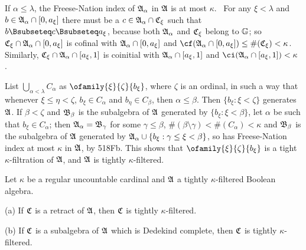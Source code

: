 {\medskip

 If $\alpha\le\lambda$, the Freese-Nation index of
$\frak A_{\alpha}$ in $\frak A$ is at most $\kappa$.   \Prf\ For any
$\xi<\lambda$ and $b\in\frak A_{\alpha}\cap[0,a_{\xi}]$ there must be a
$c\in\frak A_{\alpha}\cap\frak C_{\xi}$ such that
$b\Bsubseteq c\Bsubseteq a_{\xi}$, because both $\frak A_{\alpha}$ and
$\frak C_{\xi}$ belong to $\Bbb G$;  so
$\frak C_{\xi}\cap\frak A_{\alpha}\cap[0,a_{\xi}]$ is cofinal with
$\frak A_{\alpha}\cap[0,a_{\xi}]$ and
$\cf(\frak A_{\alpha}\cap[0,a_{\xi}])\le\#(\frak C_{\xi})<\kappa$.
Similarly, $\frak C_{\xi}\cap\frak A_{\alpha}\cap[a_{\xi},1]$ is
coinitial with $\frak A_{\alpha}\cap[a_{\xi},1]$ and
$\ci(\frak A_{\alpha}\cap[a_{\xi},1])<\kappa$.\ \Qed

\medskip

 List $\bigcup_{\alpha<\lambda}C_{\alpha}$ as
$\ofamily{\xi}{\zeta}{b_{\xi}}$, where $\zeta$ is an ordinal, in such a
way that whenever $\xi\le\eta<\zeta$, $b_{\xi}\in C_{\alpha}$ and
$b_{\eta}\in C_{\beta}$, then $\alpha\le\beta$.   Then
$\{b_{\xi}:\xi<\zeta\}$ generates $\frak A$.   If $\beta<\zeta$ and
$\frak B_{\beta}$ is the subalgebra of $\frak A$ generated by
$\{b_{\xi}:\xi<\beta\}$, let $\alpha$ be such that
$b_{\xi}\in C_{\alpha}$;  then $\frak A_{\alpha}=\frak B_{\gamma}$ for
some $\gamma\le\beta$, $\#(\beta\setminus\gamma)<\#(C_{\alpha})<\kappa$
and $\frak B_{\beta}$ is the subalgebra of $\frak A$ generated by
$\frak A_{\alpha}\cup\{b_{\xi}:\gamma\le\xi<\beta\}$, so has
Freese-Nation index at most $\kappa$ in $\frak A$, by 518Fb.   This
shows that $\ofamily{\xi}{\zeta}{b_{\xi}}$ is a tight
$\kappa$-filtration of $\frak A$, and $\frak A$ is tightly
$\kappa$-filtered.
}%

 Let $\kappa$ be a regular uncountable cardinal
and $\frak A$ a tightly $\kappa$-filtered Boolean algebra.

(a) If $\frak C$ is a retract of $\frak A$, then $\frak C$ is tightly $\kappa$-filtered.

(b) If $\frak C$ is a subalgebra of $\frak A$ which is Dedekind complete, then $\frak C$ is tightly $\kappa$-filtered.

